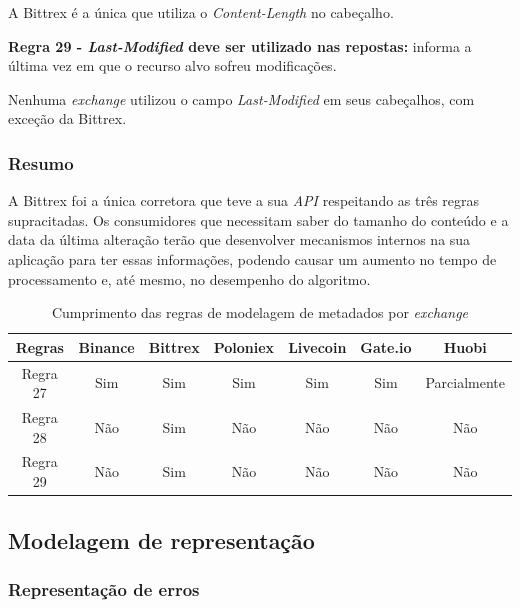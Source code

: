 A Bittrex é a única que utiliza o \textit{Content-Length} no cabeçalho.

\textbf{Regra 29 - \textit{Last-Modified} deve ser utilizado nas repostas:} informa a última vez em que o recurso alvo sofreu modificações.

Nenhuma \textit{exchange} utilizou o campo \textit{Last-Modified} em seus cabeçalhos, com exceção da Bittrex.

\subsubsection{Resumo}

A Bittrex foi a única corretora que teve a sua \textit{API} respeitando as três regras supracitadas. Os consumidores que necessitam saber do tamanho do conteúdo e a data da última alteração terão que desenvolver mecanismos internos na sua aplicação para ter essas informações, podendo causar um aumento no tempo de processamento e, até mesmo, no desempenho do algoritmo.

\begin{table}[h]
    \centering
    \begin{tabular}{|c|c|c|c|c|c|c|}
        \hline
        \textbf{Regras} & \textbf{Binance} & \textbf{Bittrex} & \textbf{Poloniex} & \textbf{Livecoin} & \textbf{Gate.io} & \textbf{Huobi} \\ \hline
        Regra 27        & Sim                & Sim                & Sim                 & Sim                 & Sim                & Parcialmente     \\ \hline
        Regra 28        & Não                & Sim                & Não                 & Não                 & Não                & Não              \\ \hline
        Regra 29        & Não                & Sim                & Não                 & Não                 & Não                & Não              \\ \hline
    \end{tabular}
    \caption{Cumprimento das regras de modelagem de metadados por \textit{exchange}}
    \label{tab:table-5}
\end{table}


\subsection{Modelagem de representação}

\subsubsection{Representação de erros}

